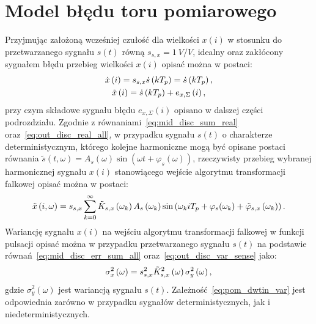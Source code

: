\section{Model błędu toru pomiarowego}

Przyjmując założoną wcześniej czułość dla wielkości $x(i)$ w stosunku do przetwarzanego sygnału $s(t)$ równą $s_{s,x} = \qty{1}{V \per V}$, idealny oraz zakłócony sygnałem błędu przebieg wielkości $x(i)$ opisać można w postaci:
\begin{gather}
\dot{x} \left(i\right) = s_{s,x} \dot{s} \left(kT_{p}\right) = \dot{s} \left(kT_{p}\right) \label{eq:pom_dwtin_ideal}, \\
\tilde{x} \left(i\right) = \dot{s} \left(kT_{p}\right) + e_{x,\Sigma} \left(i\right) \label{eq:pom_dwtin_real},
\end{gather}
przy czym składowe sygnału błędu $e_{x,\Sigma}(i)$ opisano w dalszej części podrozdziału. Zgodnie z równaniami~\eqref{eq:mid_disc_sum_real} oraz~\eqref{eq:out_disc_real_all}, w przypadku sygnału $s(t)$ o charakterze deterministycznym, którego kolejne harmoniczne mogą być opisane postaci równania $\tilde{s}(t,\omega) = A_{s}(\omega) \sin(\omega t + \varphi_{s}(\omega))$, rzeczywisty przebieg wybranej harmonicznej sygnału $x(i)$ stanowiącego wejście algorytmu transformacji falkowej opisać można w postaci:
\begin{equation}
\tilde{x} \left(i,\omega\right) =  s_{s,x} \sum_{k = 0} ^{\infty} \tilde{K}_{s,x} \left(\omega_{k}\right) A_{s} \left(\omega_{k}\right) \sin \left(\omega_{k} i T_{p} + \varphi_{s}(\omega_{k}) + \tilde{\varphi}_{s,x} \left(\omega_{k}\right)\right) \label{eq:pom_dwtin_harmsum}.
\end{equation}
Wariancję sygnału $x(i)$ na wejściu algorytmu transformacji falkowej w funkcji pulsacji opisać można w przypadku przetwarzanego sygnału $s(t)$ na podstawie równań~\eqref{eq:mid_disc_err_sum_all} oraz~\eqref{eq:out_disc_var_sense} jako:
\begin{equation}
\sigma_{x}^{2} \left(\omega\right) = s_{s,x}^{2} \tilde{K}_{s,x}^{2} \left(\omega\right) \sigma_{y}^{2} \left(\omega\right) \label{eq:pom_dwtin_var},
\end{equation}
gdzie $\sigma_{y}^{2}(\omega)$ jest wariancją sygnału $s(t)$. Zależność~\eqref{eq:pom_dwtin_var} jest odpowiednia zarówno w przypadku sygnałów deterministycznych, jak i niedeterministycznych.

